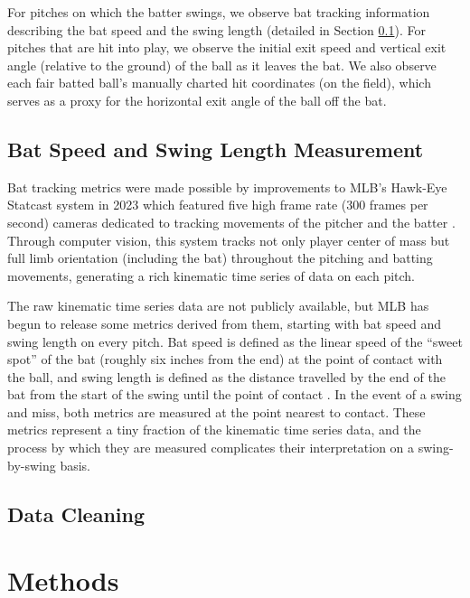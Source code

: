 \documentclass{article}
\begin{document}
    For pitches on which the batter swings, we observe bat tracking information describing the bat speed and the swing length (detailed in Section \ref{sec:measurement}). For pitches that are hit into play, we observe the initial exit speed and vertical exit angle (relative to the ground) of the ball as it leaves the bat. We also observe each fair batted ball's manually charted hit coordinates (on the field), which serves as a proxy for the horizontal exit angle of the ball off the bat.

    \subsection{Bat Speed and Swing Length Measurement}
    \label{sec:measurement}

      Bat tracking metrics were made possible by improvements to MLB's Hawk-Eye Statcast system in 2023 which featured five high frame rate (300 frames per second) cameras dedicated to tracking movements of the pitcher and the batter \citep{goldbeck_introducing_2023}. Through computer vision, this system tracks not only player center of mass but full limb orientation (including the bat) throughout the pitching and batting movements, generating a rich kinematic time series of data on each pitch.

      The raw kinematic time series data are not publicly available, but MLB has begun to release some metrics derived from them, starting with bat speed and swing length on every pitch. Bat speed is defined as the linear speed of the ``sweet spot'' of the bat (roughly six inches from the end) at the point of contact with the ball, and swing length is defined as the distance travelled by the end of the bat from the start of the swing until the point of contact \citep{petriello_everything_2024}. In the event of a swing and miss, both metrics are measured at the point nearest to contact. These metrics represent a tiny fraction of the kinematic time series data, and the process by which they are measured complicates their interpretation on a swing-by-swing basis.

    \subsection{Data Cleaning}

  \section{Methods}
  \label{sec:methods}
\end{document}
